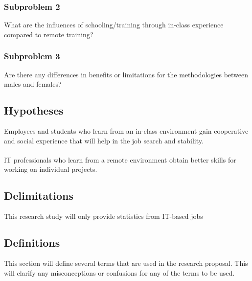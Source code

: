 \documentclass[titlepage]{article}
\begin{document}
\subsubsection{Subproblem 2}
What are the influences of schooling/training through in-class experience
compared to remote training?

\subsubsection{Subproblem 3}
Are there any differences in benefits or limitations for the methodologies between males
and females?

\subsection{Hypotheses}

Employees and students who learn from an in-class environment gain cooperative and
social experience that will help in the job search and stability.\\
\\
IT professionals who learn from a remote environment obtain better skills for working
on individual projects.

\subsection{Delimitations}
This research study will only provide statistics from IT-based jobs

\subsection{Definitions}
This section will define several terms that are used in the research proposal.  This will clarify
any misconceptions or confusions for any of the terms to be used.
\end{document}
